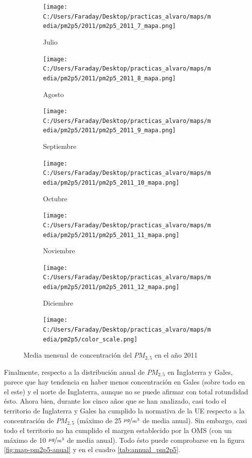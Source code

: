 \documentclass[12pt]{article}
\begin{document}
\begin{figure}[H]
\begin{subfigure}[H]{0.15\textwidth}
\texttt{[image: C:/Users/Faraday/Desktop/practicas\_alvaro/maps/media/pm2p5/2011/pm2p5\_2011\_7\_mapa.png]}
\captionsetup{labelformat=empty}
\caption{Julio}
\label{fig:map-pm2p5-2011-7}
\end{subfigure}
%
\begin{subfigure}[H]{0.15\textwidth}
\texttt{[image: C:/Users/Faraday/Desktop/practicas\_alvaro/maps/media/pm2p5/2011/pm2p5\_2011\_8\_mapa.png]}
\captionsetup{labelformat=empty}
\caption{Agosto}
\label{fig:map-pm2p5-2011-8}
\end{subfigure}
%
\begin{subfigure}[H]{0.15\textwidth}
\texttt{[image: C:/Users/Faraday/Desktop/practicas\_alvaro/maps/media/pm2p5/2011/pm2p5\_2011\_9\_mapa.png]}
\captionsetup{labelformat=empty}
\caption{Septiembre}
\label{fig:map-pm2p5-2011-9}
\end{subfigure}
%
\begin{subfigure}[H]{0.15\textwidth}
\texttt{[image: C:/Users/Faraday/Desktop/practicas\_alvaro/maps/media/pm2p5/2011/pm2p5\_2011\_10\_mapa.png]}
\captionsetup{labelformat=empty}
\caption{Octubre}
\label{fig:map-pm2p5-2011-10}
\end{subfigure}
%
\begin{subfigure}[H]{0.15\textwidth}
\texttt{[image: C:/Users/Faraday/Desktop/practicas\_alvaro/maps/media/pm2p5/2011/pm2p5\_2011\_11\_mapa.png]}
\captionsetup{labelformat=empty}
\caption{Noviembre}
\label{fig:map-pm2p5-2011-11}
\end{subfigure}
%
\begin{subfigure}[H]{0.15\textwidth}
\texttt{[image: C:/Users/Faraday/Desktop/practicas\_alvaro/maps/media/pm2p5/2011/pm2p5\_2011\_12\_mapa.png]}
\captionsetup{labelformat=empty}
\caption{Diciembre}
\label{fig:map-pm2p5-2011-12}
\end{subfigure}

\begin{subfigure}[H]{0.45\textwidth}
\texttt{[image: C:/Users/Faraday/Desktop/practicas\_alvaro/maps/media/pm2p5/color\_scale.png]}
\captionsetup{labelformat=empty}
\caption{}
\end{subfigure}

\vspace*{-7mm}
\caption{Media mensual de concentración del $PM_{2,5}$ en el año 2011}
\label{fig:map-pm2p5-2011}
\end{figure}

Finalmente, respecto a la distribución anual de $PM_{2,5}$ en Inglaterra y Gales, parece que hay tendencia en haber menos concentración en Gales (sobre todo en el este) y el norte de Inglaterra, aunque no se puede afirmar con total rotundidad ésto. Ahora bien, durante los cinco años que se han analizado, casi todo el territorio de Inglaterra y Gales ha cumplido la normativa de la UE respecto a la concentración de $PM_{2,5}$ (máximo de 25 $\nicefrac{\mu g}{m^3}$ de media anual). Sin embargo, casi todo el territorio no ha cumplido el margen establecido por la OMS (con un máximo de 10 $\nicefrac{\mu g}{m^3}$ de media anual). Todo ésto puede comprobarse en la figura \ref{fig:map-pm2p5-anual} y en el cuadro \ref{tab:annual_pm2p5}.
\end{document}
